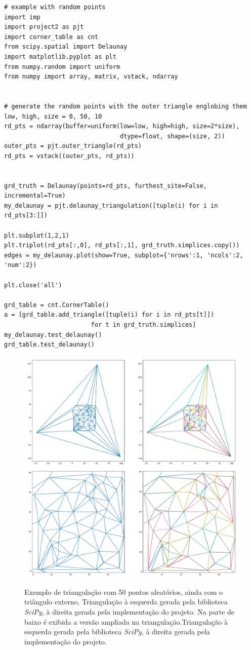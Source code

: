 \documentclass[a4paper]{article}
\begin{document}
\begin{verbatim}
# example with random points
import imp
import project2 as pjt
import corner_table as cnt
from scipy.spatial import Delaunay
import matplotlib.pyplot as plt
from numpy.random import uniform
from numpy import array, matrix, vstack, ndarray


# generate the random points with the outer triangle englobing them
low, high, size = 0, 50, 10
rd_pts = ndarray(buffer=uniform(low=low, high=high, size=2*size), 
								dtype=float, shape=(size, 2))
outer_pts = pjt.outer_triangle(rd_pts)
rd_pts = vstack((outer_pts, rd_pts))


grd_truth = Delaunay(points=rd_pts, furthest_site=False, incremental=True)
my_delaunay = pjt.delaunay_triangulation([tuple(i) for i in rd_pts[3:]])

plt.subplot(1,2,1)
plt.triplot(rd_pts[:,0], rd_pts[:,1], grd_truth.simplices.copy())
edges = my_delaunay.plot(show=True, subplot={'nrows':1, 'ncols':2, 'num':2})

plt.close('all')

grd_table = cnt.CornerTable()
a = [grd_table.add_triangle([tuple(i) for i in rd_pts[t]]) 
						for t in grd_truth.simplices]
my_delaunay.test_delaunay()
grd_table.test_delaunay()

\end{verbatim}



\begin{figure}[H]
	\centering
	\includegraphics[width=1.0\textwidth]{./imgs/ex1_outer.png}
	\label{fig:ex1} 
	\caption[caption]{Exemplo de triangulação com 50 pontos aleatórios, ainda com o triângulo externo. Triangulação à esquerda gerada pela biblioteca \textit{SciPy}, à direita gerada pela implementação do projeto. Na parte de baixo é exibida a versão ampliada na triangulação.Triangulação à esquerda gerada pela biblioteca \textit{SciPy}, à direita gerada pela implementação do projeto.}
\end{figure}
\end{document}
